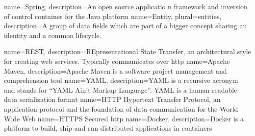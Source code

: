 {
  name={Spring},
  description={An open source applicatio	n framework and inversion of control container for the Java platform}
}
{
	name={Entity},
	plural={entities},
	description={A group of data fields which are part of a bigger concept sharing an identity and a common lifecycle.\cite{evans2003domain}}
}

{
  name={REST},
  description={REpresentational State Transfer, an architectural style for creating web services. Typically communicates over \gls{http}}
}
{
  name={Apache Maven},
  description={Apache Maven is a software project management and comprehension tool}
}
{
  name={YAML},
  description={YAML is a recursive acronym and stands for \enquote{YAML Ain't Markup Language}. YAML is a human-readable data serialization format}
}
{
  name={HTTP}
}
{
	Hypertext Transfer Protocol, an application protocol and the foundation of data communication for the World Wide Web \cite{http_wikipedia}
}
{
  name={HTTPS}
}
{
	Secured \gls{http}
}
{
  name={Docker},
  description={Docker is a platform to build, ship and run distributed applications in containers}
}
